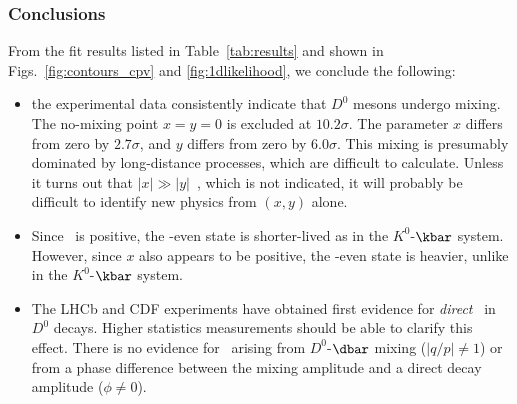 
\subsubsection{Conclusions}

From the fit results listed in Table~\ref{tab:results}
and shown in Figs.~\ref{fig:contours_cpv} and \ref{fig:1dlikelihood},
we conclude the following:
\begin{itemize}
\item the experimental data consistently indicate that 
$D^0$ mesons undergo mixing. The no-mixing point $x=y=0$
is excluded at $10.2\sigma$. The parameter $x$ differs from
zero by $2.7\sigma$, and $y$ differs from zero by
$6.0\sigma$. This mixing is presumably dominated 
by long-distance processes, which are difficult to calculate.
Unless it turns out that $|x|\gg |y|$~\cite{Bigi:2000wn},
which is not indicated, it will probably be difficult to 
identify new physics from $(x,y)$ alone.
\item Since \ycp\ is positive, the \cp-even state is shorter-lived
as in the $K^0$-$\kbar$ system. However, since $x$ also appears
to be positive, the \cp-even state is heavier, 
unlike in the $K^0$-$\kbar$ system.
\item The LHCb and CDF experiments have obtained first evidence
for {\it direct\/} \cpv\ in $D^0$ decays. Higher statistics 
measurements should be able to clarify this effect. There is 
no evidence for \cpv\ arising from $D^0$-$\dbar$ mixing 
($|q/p|\neq 1$) or from a phase difference between the 
mixing amplitude and a direct decay amplitude ($\phi\neq 0$). 
\end{itemize}


